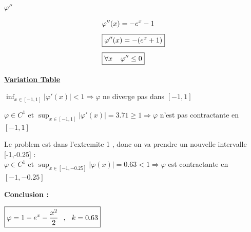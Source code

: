 \newpage
\textbf{\underline{\(\varphi''\)}}
\begin{center}
    \begin{align*}
        &\varphi''(x) = - e^{x} - 1 \\[0.15cm]
        &\boxed{\varphi''(x) = - (e^{x} + 1)}\\[0.15cm]
        &\boxed{\forall x \hspace{0.4cm} \varphi'' \leq 0}\\[0.1cm]
    \end{align*}
\end{center}

\vspace{1cm}
\textbf{\underline{Variation Table}}

\begin{center}
\end{center}
\vspace{0.25cm}

\vspace{0.25cm}

\(\displaystyle\inf_{x \in [-1,1]} |\varphi'(x)| < 1 \Longrightarrow \varphi\) ne diverge pas dans \([-1,1]\)

\vspace{0.5cm}
\(\varphi \in C^{1} \text{  et } \displaystyle\sup_{x \in [-1, 1]} |\varphi'(x)| = 3.71 \geq 1 \Longrightarrow \varphi\) n'est pas contractante en \([-1,1]\)

\vspace{0.5cm}
Le problem est dans l'extremite 1 , donc on va prendre un nouvelle intervalle [-1,-0.25] :\\[0.15cm]
\( \varphi \in C^{1} \text{ et } \displaystyle\sup_{x \in [-1, -0.25]} |\varphi(x)| = 0.63 < 1 \Longrightarrow \varphi\) est contractante en \([-1,-0.25]\)

\vspace{1.25cm}
\textbf{Conclusion :}
\vspace{-0.25cm}
\begin{center}
    \(\boxed{\varphi = 1 - e^{x} - \dfrac{x^2}{2} \hspace{0.25cm},\hspace{0.25cm} k = 0.63}\)
\end{center}

